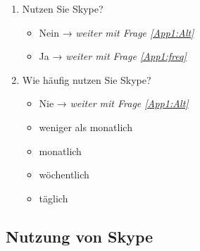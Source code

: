 
\begin{enumerate}
\item Nutzen Sie Skype?
		
        \begin{itemize}
		\item[\Circle] Nein → \textit{weiter mit Frage \ref{App1:Alt}}
        \item[\Circle] Ja → \textit{weiter mit Frage \ref{App1:freq}}
		\end{itemize}


\item  Wie häufig nutzen Sie Skype?\label{App1:freq}
		
        \begin{itemize}
		\item[\Circle] Nie → \textit{weiter mit Frage \ref{App1:Alt}}
        \item[\Circle] weniger als monatlich
        \item[\Circle] monatlich
        \item[\Circle] wöchentlich
        \item[\Circle] täglich
		\end{itemize}
\end{enumerate}

\subsection*{Nutzung von Skype}\largerpage
\label{App1:SectionNutzung}

